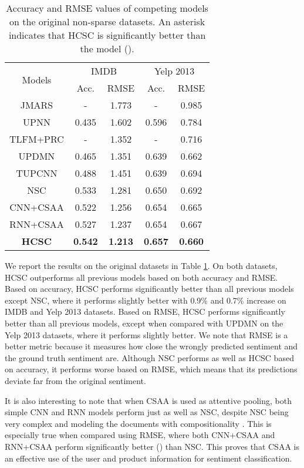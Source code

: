 \documentclass[11pt,a4paper]{article}
\begin{document}
\begin{table}[t]
  \small
  \centering
    \begin{tabular}{|c|cc|cc|}
    \hline
    \multirow{2}[1]{*}{Models} & \multicolumn{2}{c|}{IMDB} & \multicolumn{2}{c|}{Yelp 2013} \\
\cline{2-5}      & Acc. & RMSE & Acc. & RMSE \\
    \hline
    JMARS & - & 1.773 & - & 0.985 \\
    UPNN & 0.435 & 1.602 & 0.596 & 0.784 \\
    TLFM+PRC & - & 1.352 & - & 0.716 \\
    UPDMN & 0.465 & 1.351 & 0.639 & 0.662 \\
    TUPCNN & 0.488 & 1.451 & 0.639 & 0.694 \\
    NSC & 0.533 & 1.281 & 0.650 & 0.692 \\
    \hline
    CNN+CSAA & 0.522 & 1.256 & 0.654 & 0.665 \\
    RNN+CSAA & 0.527 & 1.237 & 0.654 & 0.667 \\
    \textbf{HCSC} & \textbf{0.542} & \textbf{1.213} & \textbf{0.657} & \textbf{0.660} \\
    \hline
    \end{tabular}\caption{Accuracy and RMSE values of competing models on the original non-sparse datasets. An asterisk indicates that HCSC is significantly better than the model ().}
  \label{tab:res_orig}\end{table}

We report the results on the original datasets in Table \ref{tab:res_orig}. On both datasets, HCSC outperforms all previous models based on both accuracy and RMSE. Based on accuracy, HCSC performs significantly better than all previous models except NSC, where it performs slightly better with 0.9\% and 0.7\% increase on IMDB and Yelp 2013 datasets. Based on RMSE, HCSC performs significantly better than all previous models, except when compared with UPDMN on the Yelp 2013 datasets, where it performs slightly better. We note that RMSE is a better metric because it measures how close the wrongly predicted sentiment and the ground truth sentiment are. Although NSC performs as well as HCSC based on accuracy, it performs worse based on RMSE, which means that its predictions deviate far from the original sentiment.

It is also interesting to note that when CSAA is used as attentive pooling, both simple CNN and RNN models perform just as well as NSC, despite NSC being very complex and modeling the documents with compositionality \cite{chen2016neural}. This is especially true when compared using RMSE, where both CNN+CSAA and RNN+CSAA perform significantly better () than NSC. This proves that CSAA is an effective use of the user and product information for sentiment classification.
\end{document}
